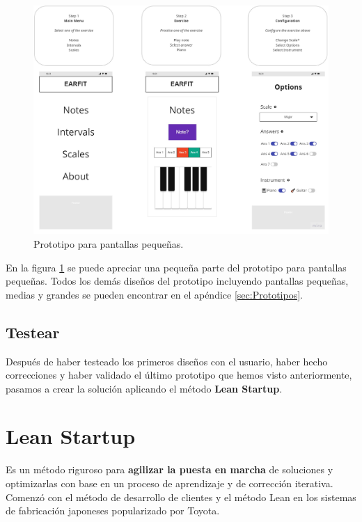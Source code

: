 \documentclass[12pt,twoside,titlepage]{report}
\begin{document}
\begin{figure}[H]
    \centering
    \includegraphics[width=\textwidth]{Design Thinking/Prototipo/Small/Prototipo}
    \caption{Prototipo para pantallas pequeñas.}
    \label{fig:PrototipoSmall}
\end{figure}

En la figura \ref{fig:PrototipoSmall} se puede apreciar una pequeña parte del prototipo para pantallas pequeñas. Todos los demás diseños del prototipo incluyendo pantallas pequeñas, medias y grandes se pueden encontrar en el apéndice \ref{sec:Prototipos}.

\subsection{Testear}

Después de haber testeado los primeros diseños con el usuario, haber hecho correcciones y haber validado el último prototipo que hemos visto anteriormente, pasamos a crear la solución aplicando el método \textbf{Lean Startup}.

\section{Lean Startup}

Es un método riguroso para \textbf{agilizar la puesta en marcha} de soluciones y optimizarlas con base en un proceso de aprendizaje y de corrección iterativa. Comenzó con el método de desarrollo de clientes y el método Lean en los sistemas de fabricación japoneses popularizado por Toyota.
\end{document}
